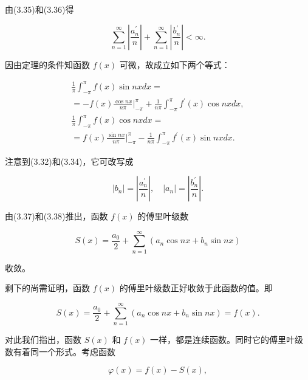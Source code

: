 由(3.35)和(3.36)得

\begin{equation*}
\sum_ {n = 1} ^ {\infty} \left| \frac {a _ {n} ^ {\prime}}{n} \right| + \sum_ {n = 1} ^ {\infty} \left| \frac {b _ {n} ^ {\prime}}{n} \right| <   \infty .\tag{3.37}
\end{equation*}

因由定理的条件知函数 $f(x)$ 可微，故成立如下两个等式：

\begin{equation*}
\begin{array}{l} \frac {1}{\pi} \int_ {- \pi} ^ {\pi} f (x) \sin n x d x = \\ = - f (x) \frac {\cos n x}{n \pi} \Bigg | _ {- \pi} ^ {\pi} + \frac {1}{n \pi} \int_ {- \pi} ^ {\pi} f ^ {\prime} (x) \cos n x d x, \\ \frac {1}{\pi} \int_ {- \pi} ^ {\pi} f (x) \cos n x d x = \\ = f (x) \frac {\sin n x}{n \pi} \Bigg | _ {- \pi} ^ {\pi} - \frac {1}{n \pi} \int_ {- \pi} ^ {\pi} f ^ {\prime} (x) \sin n x d x. \end{array}
\end{equation*}

注意到(3.32)和(3.34)，它可改写成

\begin{equation*}
\left| b _ {n} \right| = \left| \frac {a _ {n} ^ {\prime}}{n} \right|, \quad \left| a _ {n} \right| = \left| \frac {b _ {n} ^ {\prime}}{n} \right|.\tag{3.38}
\end{equation*}

由(3.37)和(3.38)推出，函数 $f(x)$ 的傅里叶级数

\begin{equation*}
S (x) = \frac {a _ {0}}{2} + \sum_ {n = 1} ^ {\infty} \left(a _ {n} \cos n x + b _ {n} \sin n x\right)\tag{3.39}
\end{equation*}

收敛。

剩下的尚需证明，函数 $f(x)$ 的傅里叶级数正好收敛于此函数的值。即

\begin{equation*}
S (x) = \frac {a _ {0}}{2} + \sum_ {n = 1} ^ {\infty} \left(a _ {n} \cos n x + b _ {n} \sin n x\right) = f (x).
\end{equation*}

对此我们指出，函数 $S(x)$ 和 $f(x)$ 一样，都是连续函数。同时它的傅里叶级数有着同一个形式。考虑函数

\begin{equation*}
\varphi (x) = f (x) - S (x),\tag{3.40}
\end{equation*}

